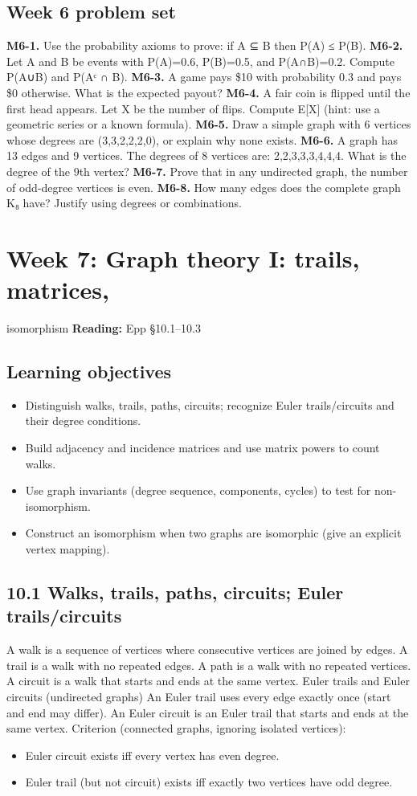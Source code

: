 \documentclass[11pt]{article}
\begin{document}
\subsection*{Week 6 problem set}
\textbf{M6-1.} Use the probability axioms to prove: if A ⊆ B then P(A) ≤ P(B).
\textbf{M6-2.} Let A and B be events with P(A)=0.6, P(B)=0.5, and P(A∩B)=0.2. Compute P(A∪B)
and P(Aᶜ ∩ B).
\textbf{M6-3.} A game pays \$10 with probability 0.3 and pays \$0 otherwise. What is the
expected payout?
\textbf{M6-4.} A fair coin is flipped until the first head appears. Let X be the number of flips.
Compute E[X] (hint: use a geometric series or a known formula).
\textbf{M6-5.} Draw a simple graph with 6 vertices whose degrees are (3,3,2,2,2,0), or explain
why none exists.
\textbf{M6-6.} A graph has 13 edges and 9 vertices. The degrees of 8 vertices are:
2,2,3,3,3,4,4,4. What is the degree of the 9th vertex?
\textbf{M6-7.} Prove that in any undirected graph, the number of odd-degree vertices is even.
\textbf{M6-8.} How many edges does the complete graph K₈ have? Justify using degrees or
combinations.

\clearpage
\section{Week 7: Graph theory I: trails, matrices,}
isomorphism
\textbf{Reading:} Epp §10.1–10.3
\subsection*{Learning objectives}
\begin{itemize}[leftmargin=*,itemsep=0.25em]
\item Distinguish walks, trails, paths, circuits; recognize Euler trails/circuits and their degree conditions.
\item Build adjacency and incidence matrices and use matrix powers to count walks.
\item Use graph invariants (degree sequence, components, cycles) to test for non-isomorphism.
\item Construct an isomorphism when two graphs are isomorphic (give an explicit vertex mapping).
\end{itemize}
\subsection{10.1 Walks, trails, paths, circuits; Euler trails/circuits}
A walk is a sequence of vertices where consecutive vertices are joined by edges. A trail is
a walk with no repeated edges. A path is a walk with no repeated vertices. A circuit is a
walk that starts and ends at the same vertex.
Euler trails and Euler circuits (undirected graphs)
An Euler trail uses every edge exactly once (start and end may differ).
An Euler circuit is an Euler trail that starts and ends at the same vertex.
Criterion (connected graphs, ignoring isolated vertices):
\begin{itemize}[leftmargin=*,itemsep=0.25em]
\item Euler circuit exists iff every vertex has even degree.
\item Euler trail (but not circuit) exists iff exactly two vertices have odd degree.
\end{itemize}
\end{document}
